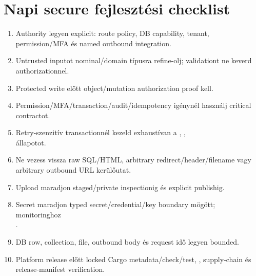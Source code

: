 \section{Napi secure fejlesztési checklist}

\begin{enumerate}
  \item Authority legyen explicit: route policy, DB capability, tenant, permission/MFA és named outbound integration.
  \item Untrusted inputot nominal/domain típusra refine-olj; validationt ne keverd authorizationnel.
  \item Protected write előtt object/mutation authorization proof kell.
  \item Permission/MFA/transaction/audit/idempotency igénynél használj critical contractot.
  \item Retry-szenzitív transactionnél kezeld exhaustívan a , ,\\  állapotot.
  \item Ne vezess vissza raw SQL/HTML, arbitrary redirect/header/filename vagy arbitrary outbound URL kerülőutat.
  \item Upload maradjon staged/private inspectionig és explicit publishig.
  \item Secret maradjon typed secret/credential/key boundary mögött; monitoringhoz\\ .
  \item DB row, collection, file, outbound body és request idő legyen bounded.
  \item Platform release előtt locked Cargo metadata/check/test, , supply-chain és release-manifest verification.
\end{enumerate}
